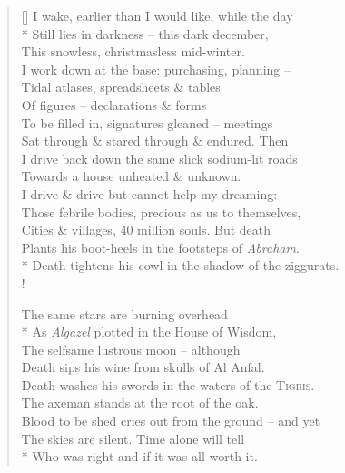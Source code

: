 \settowidth{\versewidth}{Blood to be shed cries out from the ground -- and yet}
\begin{verse}[\versewidth]
    I wake, earlier than I would like, while the day\\*
    Still lies in darkness -- this dark december,\\
    This snowless, christmasless mid-winter.\\
    I work down at the base: purchasing, planning --\\
    Tidal atlases, spreadsheets \& tables\\
    Of figures -- declarations \& forms\\
    To be filled in, signatures gleaned -- meetings\\
    Sat through \& stared through \& endured. Then\\
    I drive back down the same slick sodium-lit roads\\
    Towards a house unheated \& unknown.\\
    I drive \& drive but cannot help my dreaming:\\
    Those febrile bodies, precious as us to themselves,\\
    Cities \& villages, 40 million souls. But death\\
    Plants his boot-heels in the footsteps of \textit{Abraham}.\\*
    Death tightens his cowl in the shadow of the ziggurats.\\!

    The same stars are burning overhead\\*
    As \textit{Algazel} plotted in the House of Wisdom,\\
    The selfsame lustrous moon -- although\\
    Death sips his wine from skulls of Al Anfal.\\
    Death washes his swords in the waters of the \textsc{Tigris}.\\
    The axeman stands at the root of the oak.\\
    Blood to be shed cries out from the ground -- and yet\\
    The skies are silent. Time alone will tell\\*
    Who was right and if it was all worth it.
\end{verse}


